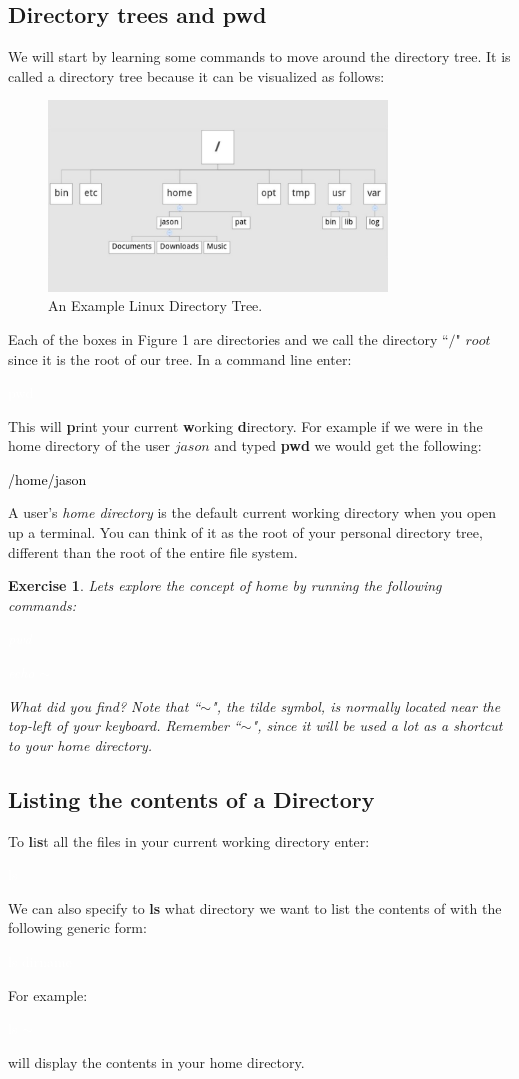 \documentclass[oneside]{book}
\newcommand{\commandline}[1]{\begin{center} \colorbox{Dark}{\textcolor{white}{#1}} \end{center}}
\newcommand{\exampleout}[1]{\begin{center} \colorbox{Light}{\textcolor{black}{#1}} \end{center}}
\newtheorem{ex}{Exercise}[chapter]
\begin{document}
\subsection{Directory trees and pwd}
We will start by learning some commands to move around the directory tree. It is called a directory tree because it can be visualized as follows:

\begin{figure}[H]
	\centering
	\label{tab:directory_tree}
	\includegraphics[width=90mm]{linux-directory-tree.jpg}
	\caption{An Example Linux Directory Tree.} 
\end{figure}

Each of the boxes in Figure 1 are directories and we call the directory ``$/$" $root$ since it is the root of our tree. In a command line enter:
	\commandline{pwd}
  This will \textbf{p}rint your current \textbf{w}orking \textbf{d}irectory. For example if we were in the home directory of the user $jason$ and typed \textbf{pwd} we would get the following:
	\exampleout {/home/jason}
	
A user's \textit{home directory} is the default current working directory when you open up a terminal. You can think of it as the root of your personal directory tree, different than the root of the entire file system.


\begin{ex} 
	Lets explore the concept of home by running the following commands:
	\commandline{pwd}
	\commandline{echo $\sim$ }
	What did you find? Note that ``$\sim$", the tilde symbol, is normally located near the top-left of your keyboard. Remember ``$\sim$", since it will be used a lot as a shortcut to your home directory.
\end{ex}

\subsection{Listing the contents of a Directory}
To \textbf{l}i\textbf{s}t all the files in your current working directory enter:
	\commandline{ls}
	We can also specify to \textbf{ls} what directory we want to list the contents of with the following generic form:
  	\commandline{ls dirname}
For example:
	\commandline{ls $\sim$}
will display the contents in your home directory.
\end{document}
